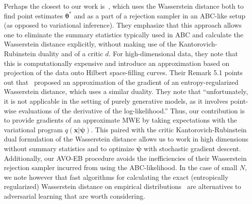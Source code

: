 \documentclass[twocolumn,superscriptaddress,aps]{revtex4-1}
\newcommand{\kcnote}[1]{\textcolor{red}{[KC: #1]}}
\newcommand{\bftheta}{{\bm \theta}}
\newcommand{\bfpsi}{{\bm \psi}}
\newcommand{\bfx}{\mathbf{x}}
\theoremstyle{plain}
\begin{document}

Perhaps the closest to our work is~\cite{bernton2017inference}, which uses the
Wasserstein distance both to find point estimates $\bftheta^*$ and as a part of
a rejection sampler in an ABC-like setup (as opposed to variational inference).
They emphasize that this approach allows one to eliminate the summary statistics
typically used in ABC and calculate the Wasserstein distance explicitly, without
making use of the Kantorovich-Rubinstein duality and of a critic $d$. For high-dimensional
data, they note that this is computationally expensive and introduce an
approximation based on projection of the data onto Hilbert space-filling curves.
Their Remark 5.1 points out that~\citep{montavon2016wasserstein} proposed an
approximation of the gradient of an entropy-regularized Wasserstein distance,
which uses a similar duality. They note that ``unfortunately, it is not
applicable in the setting of purely generative models, as it involves point-wise
evaluations of the derivative of the log-likelihood.'' Thus, our contribution is
to provide gradients of an approximate MWE by taking expectations with the
variational program $q(\bfx | \bfpsi)$. This paired with the critic
Kantorovich-Rubinstein dual formulation of the Wasserstein distance
allows us to work in high dimensions without summary statistics and to
optimize $\bfpsi$ with stochastic gradient descent. Additionally,
our AVO-EB procedure avoids the inefficiencies of
their Wasserstein rejection sampler incurred from using the ABC-likelihood.
In the case of small $N$, we note however that fast algorithms for calculating the exact (entropically regularized) Wasserstein distance on
empirical distributions~\citep{cuturi2013sinkhorn, genevay2016stochastic, montavon2016wasserstein}
are alternatives to adversarial learning that are worth considering.


\end{document}
